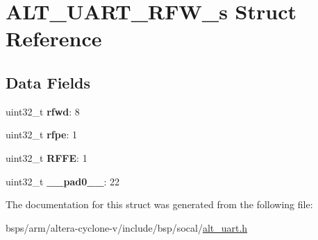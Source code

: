 \hypertarget{structALT__UART__RFW__s}{}\section{A\+L\+T\+\_\+\+U\+A\+R\+T\+\_\+\+R\+F\+W\+\_\+s Struct Reference}
\label{structALT__UART__RFW__s}
\subsection*{Data Fields}
\begin{DoxyCompactItemize}
\item 
\mbox{\label{structALT__UART__RFW__s_a4fc024d59b5ec55ff414dfb11bbe7825}} 
uint32\+\_\+t {\bfseries rfwd}\+: 8
\item 
\mbox{\label{structALT__UART__RFW__s_a063b90192f93bd3727504befa8a92deb}} 
uint32\+\_\+t {\bfseries rfpe}\+: 1
\item 
\mbox{\label{structALT__UART__RFW__s_ae9f326ed0faee9d41a0cff675b4aedde}} 
uint32\+\_\+t {\bfseries R\+F\+FE}\+: 1
\item 
\mbox{\label{structALT__UART__RFW__s_ac75d680f6d8388241074629514a4caf8}} 
uint32\+\_\+t {\bfseries \+\_\+\+\_\+pad0\+\_\+\+\_\+}\+: 22
\end{DoxyCompactItemize}


The documentation for this struct was generated from the following file\+:\begin{DoxyCompactItemize}
\item 
bsps/arm/altera-\/cyclone-\/v/include/bsp/socal/\mbox{\hyperlink{alt__uart_8h}{alt\+\_\+uart.\+h}}\end{DoxyCompactItemize}
